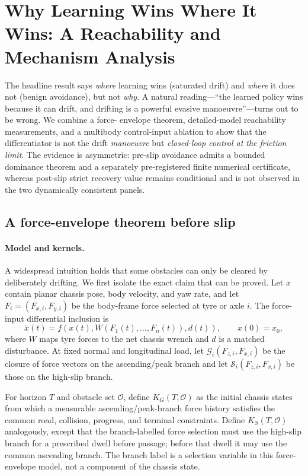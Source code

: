\documentclass[11pt]{article}
\begin{document}
\FloatBarrier
\section{Why Learning Wins Where It Wins: A Reachability and Mechanism Analysis}
\label{sec:why}
The headline result says \emph{where} learning wins (saturated drift) and \emph{where} it does not
(benign avoidance), but not \emph{why}. A natural reading---``the learned policy wins because it can
drift, and drifting is a powerful evasive manoeuvre''---turns out to be wrong. We combine a force-
envelope theorem, detailed-model reachability measurements, and a multibody control-input ablation
to show that the differentiator is not the drift \emph{manoeuvre} but \emph{closed-loop control at the friction
limit}. The evidence is asymmetric: pre-slip avoidance admits a bounded dominance theorem and a
separately pre-registered finite numerical certificate, whereas post-slip strict recovery value
remains conditional and is not observed in the two dynamically consistent panels.

\subsection{A force-envelope theorem before slip}

\paragraph{Model and kernels.}
A widespread intuition holds that some obstacles can only be cleared by deliberately drifting. We
first isolate the exact claim that can be proved. Let $x$ contain planar chassis pose, body velocity,
and yaw rate, and let $F_i=(F_{x,i},F_{y,i})$ be the body-frame force selected at tyre or axle $i$.
The force-input differential inclusion is
\begin{equation}
  \dot{x}(t)=f\!\left(x(t),W(F_1(t),\ldots,F_n(t)),d(t)\right),
  \qquad x(0)=x_0,
  \label{eq:force-envelope}
\end{equation}
where $W$ maps tyre forces to the net chassis wrench and $d$ is a matched disturbance. At fixed
normal and longitudinal load, let $\mathcal G_i(F_{z,i},F_{x,i})$ be the closure of force vectors on
the ascending/peak branch and let $\mathcal S_i(F_{z,i},F_{x,i})$ be those on the high-slip branch.

For horizon $T$ and obstacle set $\mathcal O$, define $K_G(T,\mathcal O)$ as the initial chassis
states from which a measurable ascending/peak-branch force history satisfies the common road,
collision, progress, and terminal constraints. Define $K_S(T,\mathcal O)$ analogously, except that
the branch-labelled force selection must use the high-slip branch for a prescribed dwell before
passage; before that dwell it may use the common ascending branch. The branch label is a selection
variable in this force-envelope model, not a component of the chassis state.
\end{document}

